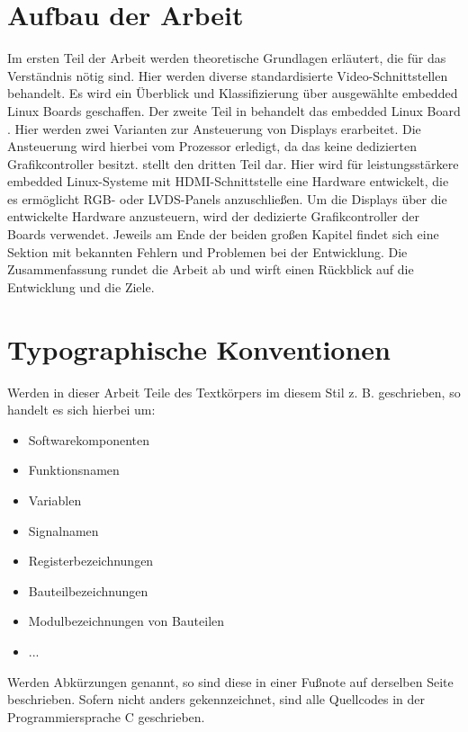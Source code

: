 \section{Aufbau der Arbeit}
Im ersten Teil der Arbeit werden theoretische Grundlagen erläutert, die für das Verständnis nötig sind. Hier werden diverse standardisierte Video-Schnittstellen behandelt. Es wird ein Überblick und Klassifizierung über ausgewählte embedded Linux Boards geschaffen.
Der zweite Teil in  behandelt das embedded Linux Board . Hier werden zwei Varianten zur Ansteuerung von Displays erarbeitet. Die Ansteuerung wird hierbei vom Prozessor erledigt, da das  keine dedizierten Grafikcontroller besitzt.
 stellt den dritten Teil dar. Hier wird für leistungsstärkere embedded Linux-Systeme mit HDMI-Schnittstelle eine Hardware entwickelt, die es ermöglicht RGB- oder LVDS-Panels anzuschließen. Um die Displays über die entwickelte Hardware anzusteuern, wird der dedizierte Grafikcontroller der Boards verwendet. Jeweils am Ende der beiden großen Kapitel findet sich eine Sektion mit bekannten Fehlern und Problemen bei der Entwicklung. Die Zusammenfassung rundet die Arbeit ab und wirft einen Rückblick auf die Entwicklung und die Ziele.

\section{Typographische Konventionen}
Werden in dieser Arbeit Teile des Textkörpers im diesem Stil z. B.  geschrieben, so handelt es sich hierbei um:
\begin{itemize}
\item Softwarekomponenten
\item Funktionsnamen
\item Variablen
\item Signalnamen
\item Registerbezeichnungen
\item Bauteilbezeichnungen
\item Modulbezeichnungen von Bauteilen
\item ...
\end{itemize}
Werden Abkürzungen genannt, so sind diese in einer Fußnote auf derselben Seite beschrieben.
Sofern nicht anders gekennzeichnet, sind alle Quellcodes in der Programmiersprache C geschrieben.
